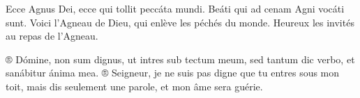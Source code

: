 
{}{}
\vspace{0.2cm}

\begin{paracol}{2}

\LigneParacol{0cm}
{Ecce Agnus Dei, ecce qui tollit peccáta mundi. Beáti qui ad cenam Agni vocáti sunt.}
{Voici l’Agneau de Dieu, qui enlève les péchés du monde. Heureux les invités au repas de l'Agneau.}

\LigneParacol{0cm}
{® Dómine, non sum dignus, ut intres sub tectum meum, sed tantum dic verbo, et sanábitur ánima mea.}
{® Seigneur, je ne suis pas digne que tu entres sous mon toit, mais dis seulement une parole, et mon âme sera guérie.}

\end{paracol}
